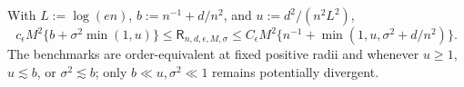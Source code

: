 With \(L:=\log(en)\), \(b:=n^{-1}+d/n^2\), and \(u:=d^2/(n^2L^2)\),
\[
 c_{\epsilon}M^2\{b+\sigma^2\min(1,u)\}
 \le\mathsf R_{n,d,\epsilon,M,\sigma}
 \le C_{\epsilon}M^2\{n^{-1}+\min(1,u,\sigma^2+d/n^2)\}.
\]
The benchmarks are order-equivalent at fixed positive radii and whenever \(u\ge1\), \(u\lesssim b\), or \(\sigma^2\lesssim b\); only \(b\ll u,\sigma^2\ll1\) remains potentially divergent.